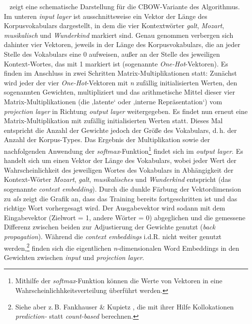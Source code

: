 ~ zeigt eine schematische Darstellung für die CBOW-Variante des Algorithmus. Im unteren \emph{input layer} ist ausschnittsweise ein Vektor der Länge des Korpusvokabulars dargestellt, in dem die vier Kontextwörter \emph{galt}, \emph{Mozart}, \emph{musikalisch} und \emph{Wunderkind} markiert sind. Genau genommen verbergen sich dahinter vier Vektoren, jeweils in der Länge des Korpusvokabulars, die an jeder Stelle des Vokabulars eine 0 aufweisen, außer an der Stelle des jeweiligen Kontext-Wortes, das mit 1 markiert ist (sogenannte \emph{One-Hot}-Vektoren). Es finden im Anschluss in zwei Schritten Matrix-Multiplikationen statt: Zunächst wird jeder der vier \emph{One-Hot}-Vektoren mit \emph{n} zufällig initialisierten Werten, den sogenannten Gewichten, multipliziert und das arithmetische Mittel dieser vier Matrix-Multiplikationen (die ‚latente` oder ‚interne Repräsentation`) vom \emph{projection layer} in Richtung \emph{output layer} weitergegeben. Es findet nun erneut eine Matrix-Multiplikation mit zufällig initialisierten Werten statt. Dieses Mal entspricht die Anzahl der Gewichte jedoch der Größe des Vokabulars, d.\,h. der Anzahl der Korpus-Types. Das Ergebnis der Multiplikation sowie der nachfolgenden Anwendung der \emph{softmax}-Funktion\footnote{Mithilfe der \emph{softmax}-Funktion können die Werte von Vektoren in eine Wahrscheinlichhkeitsverteilung überführt werden.} findet sich im \emph{output layer}. Es handelt sich um einen Vektor der Länge des Vokabulars, wobei jeder Wert der Wahrscheinlichkeit des jeweiligen Wortes des Vokabulars in Abhängigkeit der Kontext-Wörter \emph{Mozart}, \emph{galt}, \emph{musikalisches} und \emph{Wunderkind} entspricht (das sogenannte \emph{context embedding}). Durch die dunkle Färbung der Vektordimension zu \emph{als} zeigt die Grafik an, dass das Training bereits fortgeschritten ist und das richtige Wort vorhergesagt wird. Der Ausgabevektor wird sodann mit dem Eingabevektor (Zielwort = 1, andere Wörter = 0) abgeglichen und die gemessene Differenz zwischen beiden zur Adjustierung der Gewichte genutzt (\emph{back propagation}). Während die \emph{context embeddings} i.d.R. nicht weiter genutzt werden,\footnote{Siehe aber z.\,B. Fankhauser \& Kupietz \autocite*{fankhauserCountBasedPredictiveLanguage2022}, die mit ihrer Hilfe Kollokationen \emph{prediction-} statt \emph{count-based} berechnen.} finden sich die eigentlichen \emph{n}-dimensionalen Word Embeddings in den Gewichten zwischen \emph{input} und \emph{projection layer}.

